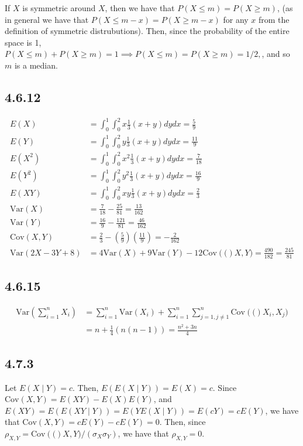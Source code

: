 \documentclass[12pt,letterpaper]{article}
\theoremstyle{definition}
\newcommand{\var}[1]{\text{Var}\left(#1\right)}
\newcommand{\cov}[1]{\text{Cov}\left(#1\right)}
\begin{document}
If $X$ is symmetric around $X$, then we have that $P(X \leq m) = P(X \geq m)$,
(as in general we have that $P(X \leq m - x) = P(X \geq m - x)$ for any $x$ from
the definition of symmetric distrubutions). Then, since the probability of the
entire space is 1, $P(X \leq m) + P(X \geq m) = 1 \implies P(X \leq m) = P(X
\geq m) = 1/2,$, and so $m$ is a median.

\subsection*{4.6.12}

\begin{align*}
  E(X) &= \int_0^1\int_0^2 x \frac{1}{3}(x+y) dy dx = \frac{5}{9}\\
  E(Y) &= \int_0^1\int_0^2 y \frac{1}{3}(x+y) dy dx = \frac{11}{9}\\
  E(X^2) &= \int_0^1\int_0^2 x^2 \frac{1}{3}(x+y) dy dx = \frac{7}{18}\\
  E(Y^2) &= \int_0^1\int_0^2 y^2 \frac{1}{3}(x+y) dy dx = \frac{16}{9} \\
  E(XY) &= \int_0^1\int_0^2xy \frac{1}{3}(x+y) dy dx = \frac{2}{3} \\
  \var{X} &= \frac{7}{18} - \frac{25}{81} = \frac{13}{162} \\
  \var{Y} &= \frac{16}{9} - \frac{121}{81} = \frac{46}{162}  \\
  \cov{X,Y} &= \frac{2}{3} - (\frac{5}{9}) (\frac{11}{9}) = -\frac{2}{162}\\
  \var{2X - 3Y + 8} &= 4\var{X} + 9\var{Y} - 12\cov(X, Y) = \frac{490}{182} = \frac{245}{81}
\end{align*}

\subsection*{4.6.15}

\begin{align*}
  \var{\sum_{i=1}^n X_i} &= \sum_{i=1}^n\var{X_i} + \sum_{i=1}^n\sum_{j=1,j\neq1}^n\cov(X_i, X_j) \\
                         &= n + \frac{1}{4}(n(n-1)) = \frac{n^2+3n}{4}
\end{align*}

\subsection*{4.7.3}

Let $E(X \mid Y) = c$. Then, $E(E(X \mid Y)) = E(X) = c$. Since $\cov{X, Y} =
E(XY) - E(X)E(Y)$, and $E(XY) = E(E(XY \mid Y)) = E(YE(X \mid Y)) = E(cY) =
cE(Y)$, we have that $\cov{X,Y} = cE(Y) - cE(Y) = 0$. Then, since $\rho_{X, Y} =
\cov(X, Y)/(\sigma_X\sigma_Y)$, we have that $\rho_{X,Y} = 0$.
\end{document}
